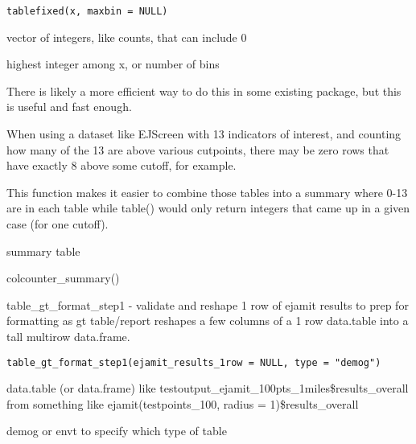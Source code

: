 \documentclass[a4paper]{book}
\begin{document}
%
\begin{Usage}
\begin{verbatim}
tablefixed(x, maxbin = NULL)
\end{verbatim}
\end{Usage}
%
\begin{Arguments}
\begin{ldescription}
\item[\code{x}] vector of integers, like counts, that can include 0

\item[\code{maxbin}] highest integer among x, or number of bins
\end{ldescription}
\end{Arguments}
%
\begin{Details}\relax
There is likely a more efficient way to do this in some existing package,
but this is useful and fast enough.

When using a dataset like EJScreen with 13 indicators of interest,
and counting how many of the 13 are above various cutpoints,
there may be zero rows that have exactly 8 above some cutoff, for example.

This function makes it easier to combine those tables into a summary
where 0-13 are in each table while table() would only return integers
that came up in a given case (for one cutoff).
\end{Details}
%
\begin{Value}
summary table
\end{Value}
%
\begin{SeeAlso}\relax
colcounter\_summary()
\end{SeeAlso}
%
\begin{Description}\relax
table\_gt\_format\_step1 - validate and reshape 1 row of ejamit results to prep for formatting as gt table/report
reshapes a few columns of a 1 row data.table into a tall multirow data.frame.
\end{Description}
%
\begin{Usage}
\begin{verbatim}
table_gt_format_step1(ejamit_results_1row = NULL, type = "demog")
\end{verbatim}
\end{Usage}
%
\begin{Arguments}
\begin{ldescription}
\item[\code{ejamit\_results\_1row}] data.table (or data.frame) like testoutput\_ejamit\_100pts\_1miles\$results\_overall
from something like ejamit(testpoints\_100, radius = 1)\$results\_overall

\item[\code{type}] demog or envt to specify which type of table
\end{ldescription}
\end{Arguments}
\end{document}
